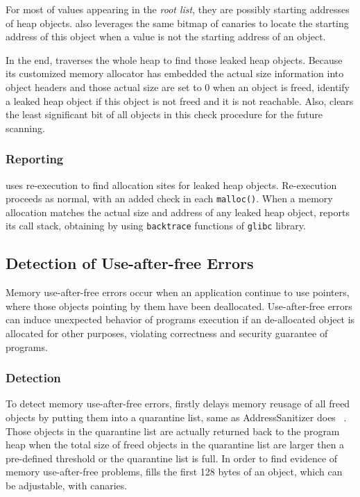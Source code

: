 For most of values appearing in the {\it root list}, they are possibly starting addresses of 
heap objects. \doubletake{} also leverages the same bitmap of canaries to locate the 
starting address of this object when a value is not the starting address of an object. 

In the end, \doubletake{} traverses the whole heap to find those leaked heap objects.
Because its customized memory allocator has embedded the actual size information into object headers 
and those actual size are set to 0 when an object is freed, 
\doubletake{} identify a leaked heap object if this object is not freed and it is not reachable. 
Also, \doubletake{} clears the least significant bit of all objects 
in this check procedure for the future scanning. 

\subsubsection{Reporting}
\label{sec:leakreport}
\doubletake{} uses re-execution to find allocation sites for leaked heap objects. 
Re-execution proceeds as normal, with an added check in each \texttt{malloc()}.
When a memory allocation matches the actual size and address of any leaked heap object, 
\doubletake{} reports its call stack, obtaining by using \texttt{backtrace} 
functions of \texttt{glibc} library. 

\subsection{Detection of Use-after-free Errors}
\label{sec:danglingpointer}
Memory use-after-free errors occur when an application continue to use pointers, 
where those objects pointing by them have been deallocated.  
Use-after-free errors can induce unexpected behavior of programs execution 
if an de-allocated object is allocated for other purposes, 
violating correctness and security guarantee of programs. 

\subsubsection{Detection}
To detect memory use-after-free errors, 
\doubletake{} firstly delays memory reusage of all freed objects 
by putting them into a quarantine list, 
same as AddressSanitizer does ~\cite{AddressSanitizer}. 
Those objects in the quarantine list are actually returned back
to the program heap when the total size of freed objects in the quarantine list 
are larger then a pre-defined threshold or the quarantine list is full.
In order to find evidence of memory use-after-free problems, 
\doubletake{} fills the first 128 bytes of an object, which can be adjustable, 
with canaries. 

